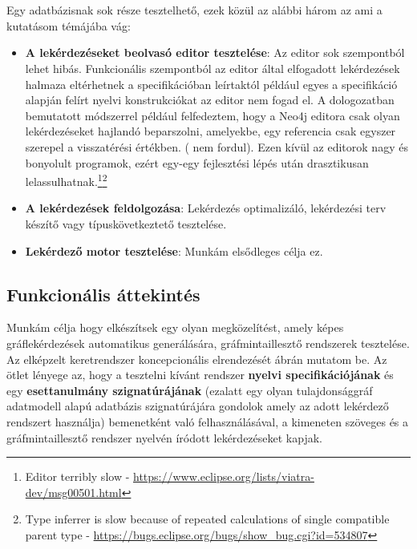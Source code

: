 \chapter{\attekintes}

Egy adatbázisnak sok része tesztelhető, ezek közül az alábbi három az ami a kutatásom témájába vág:
\begin{itemize}
	\item  \textbf{A lekérdezéseket beolvasó editor tesztelése}: Az editor sok szempontból lehet hibás. Funkcionális szempontból az editor által elfogadott lekérdezések halmaza eltérhetnek a specifikációban leírtaktól például egyes a specifikáció alapján felírt nyelvi konstrukciókat az editor nem fogad el. A dologozatban bemutatott módszerrel például felfedeztem, hogy a Neo4j  editora csak olyan lekérdezéseket hajlandó beparszolni, amelyekbe, egy referencia csak egyszer szerepel a visszatérési értékben. ( nem fordul). Ezen kívül az editorok nagy és bonyolult programok, ezért egy-egy fejlesztési lépés után drasztikusan lelassulhatnak.\footnote{Editor terribly slow - \url{https://www.eclipse.org/lists/viatra-dev/msg00501.html}}\footnote{Type inferrer is slow because of repeated calculations of single compatible parent type - \url{https://bugs.eclipse.org/bugs/show_bug.cgi?id=534807}}
	\item \textbf{A lekérdezések feldolgozása}: Lekérdezés optimalizáló, lekérdezési terv készítő vagy típuskövetkeztető tesztelése.
	\item \textbf{Lekérdező motor tesztelése}:  Munkám elsődleges célja ez.
\end{itemize}



\section{Funkcionális áttekintés}

Munkám célja hogy elkészítsek egy olyan megközelítést, amely képes gráflekérdezések automatikus generálására, gráfmintaillesztő rendszerek tesztelése. Az elképzelt  keretrendszer koncepcionális elrendezését   ábrán mutatom be. Az ötlet lényege az, hogy a tesztelni kívánt rendszer \textbf{nyelvi specifikációjának} és egy \textbf{esettanulmány szignatúrájának} (ezalatt egy olyan tulajdonsággráf adatmodell alapú adatbázis szignatúrájára gondolok amely az adott lekérdező rendszert használja) bemenetként való felhasználásával, a kimeneten szöveges és a gráfmintaillesztő rendszer nyelvén íródott lekérdezéseket kapjak. 

